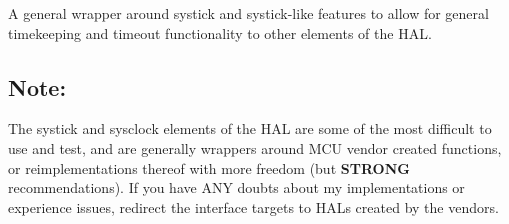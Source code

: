 A general wrapper around systick and systick-\/like features to allow for general timekeeping and timeout functionality to other elements of the H\+AL.

\subsection*{Note\+:}

The systick and sysclock elements of the H\+AL are some of the most difficult to use and test, and are generally wrappers around M\+CU vendor created functions, or reimplementations thereof with more freedom (but {\bfseries S\+T\+R\+O\+NG} recommendations). If you have A\+NY doubts about my implementations or experience issues, redirect the interface targets to H\+A\+Ls created by the vendors. 